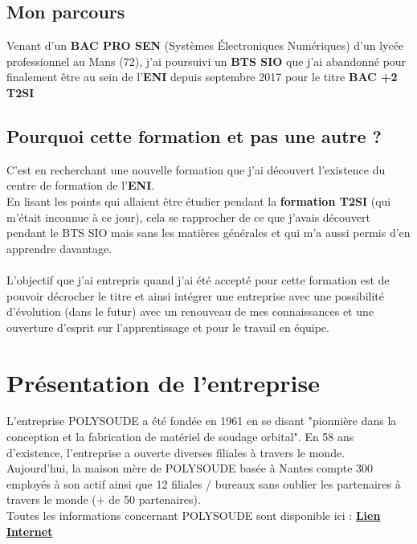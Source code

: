 \documentclass[11pt,a4paper,twoside]{article}
\begin{document}
\subsection{Mon parcours}
Venant d'un \textbf{BAC PRO SEN} (Systèmes Électroniques Numériques) d'un lycée professionnel au Mans (72), j'ai poursuivi un \textbf{BTS SIO} que j'ai abandonné pour finalement être au sein de l'\textbf{ENI} depuis septembre 2017 pour le titre \textbf{BAC +2 T2SI}

\subsection{Pourquoi cette formation et pas une autre ?}

C'est en recherchant une nouvelle formation que j'ai découvert l'existence du centre de formation de l'\textbf{ENI}.\\

En lisant les points qui allaient être étudier pendant la \textbf{formation T2SI} (qui m'était inconnue à ce jour), cela se rapprocher de ce que j'avais découvert pendant le BTS SIO mais sans les matières générales et qui m'a aussi permis d'en apprendre davantage. \\
\\
L'objectif que j'ai entrepris quand j'ai été accepté pour cette formation est de pouvoir décrocher le titre et ainsi intégrer une entreprise avec une possibilité d'évolution (dans le futur) avec un renouveau de mes connaissances et une ouverture d'esprit sur l'apprentissage et pour le travail en équipe.
\newpage

\section{Présentation de l'entreprise}
L'entreprise POLYSOUDE a été fondée en 1961 en se disant "pionnière dans la conception et la fabrication de matériel de soudage orbital". En 58 ans d'existence, l'entreprise a ouverte diverses filiales à travers le monde.\\

Aujourd'hui, la maison mère de POLYSOUDE basée à Nantes compte 300 employés à son actif ainsi que 12 filiales / bureaux sans oublier les partenaires à travers le monde (+ de 50 partenaires). \\

Toutes les informations concernant POLYSOUDE sont disponible ici : \textbf{\hyperlink{https://www.polysoude.com/}{Lien Internet}}
\end{document}
